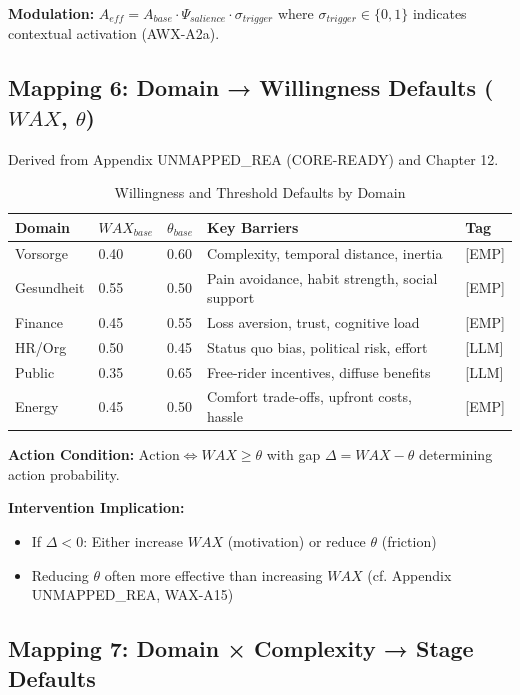 \textbf{Modulation:} $A_{eff} = A_{base} \cdot \Psi_{salience} \cdot \sigma_{trigger}$ where $\sigma_{trigger} \in \{0,1\}$ indicates contextual activation (AWX-A2a).


\subsection{Mapping 6: Domain → Willingness Defaults ($WAX$, $\theta$)}

Derived from Appendix UNMAPPED_REA (CORE-READY) and Chapter 12.

\begin{table}[htbp]
\centering
\caption{Willingness and Threshold Defaults by Domain}
\label{tab:ggg-willingness-mapping}
\renewcommand{\arraystretch}{1.3}
\begin{tabular}{@{}lllp{4cm}l@{}}
\toprule
\textbf{Domain} & \textbf{$WAX_{base}$} & \textbf{$\theta_{base}$} & \textbf{Key Barriers} & \textbf{Tag} \\
\midrule
Vorsorge & 0.40 & 0.60 & Complexity, temporal distance, inertia & [EMP] \\
Gesundheit & 0.55 & 0.50 & Pain avoidance, habit strength, social support & [EMP] \\
Finance & 0.45 & 0.55 & Loss aversion, trust, cognitive load & [EMP] \\
HR/Org & 0.50 & 0.45 & Status quo bias, political risk, effort & [LLM] \\
Public & 0.35 & 0.65 & Free-rider incentives, diffuse benefits & [LLM] \\
Energy & 0.45 & 0.50 & Comfort trade-offs, upfront costs, hassle & [EMP] \\
\bottomrule
\end{tabular}
\end{table}

\textbf{Action Condition:} $\text{Action} \Leftrightarrow WAX \geq \theta$ with gap $\Delta = WAX - \theta$ determining action probability.

\textbf{Intervention Implication:}
\begin{itemize}[nosep]
\item If $\Delta < 0$: Either increase $WAX$ (motivation) or reduce $\theta$ (friction)
\item Reducing $\theta$ often more effective than increasing $WAX$ (cf. Appendix UNMAPPED_REA, WAX-A15)
\end{itemize}


\subsection{Mapping 7: Domain × Complexity → Stage Defaults}

